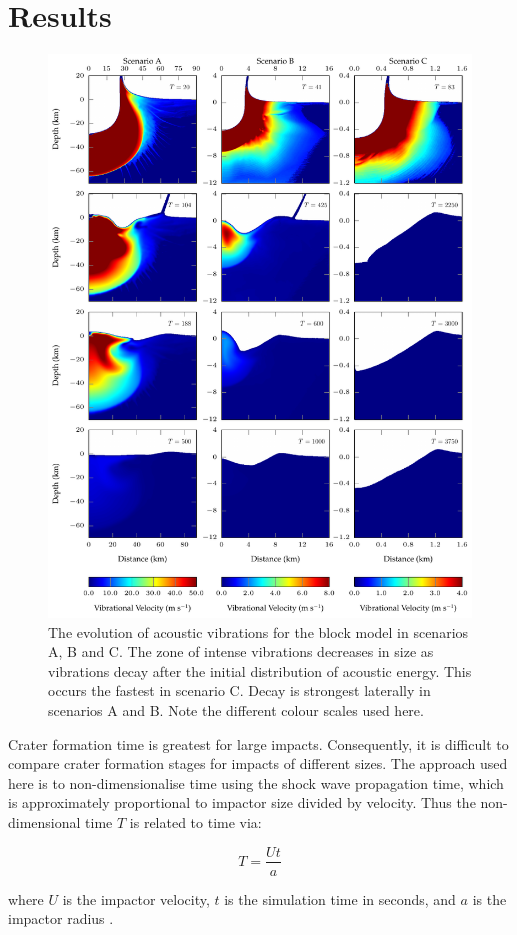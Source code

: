 \section{Results \label{sec:results}}

\begin{figure}[!b]
\centering
\includegraphics[width=0.7\linewidth]{./images/block_velo.pdf}
\caption{The evolution of acoustic vibrations for the block model in scenarios A, B and C. The zone of intense vibrations decreases in size as vibrations decay after the initial distribution of acoustic energy. This occurs the fastest in scenario C. Decay is strongest laterally in scenarios A and B. Note the different colour scales used here. \label{fig:block_velo}}
\end{figure}

Crater formation time is greatest for large impacts. Consequently, it is difficult to compare crater formation stages for impacts of different sizes. The approach used here is to non-dimensionalise time using the shock wave propagation time, which is approximately proportional to impactor size divided by velocity. Thus the non-dimensional time $T$ is related to time via:

\begin{equation}
T=\frac{Ut}{a}
\end{equation}

where $U$ is the impactor velocity, $t$ is the simulation time in seconds, and $a$ is the impactor radius \citep{o1993planetary}.

